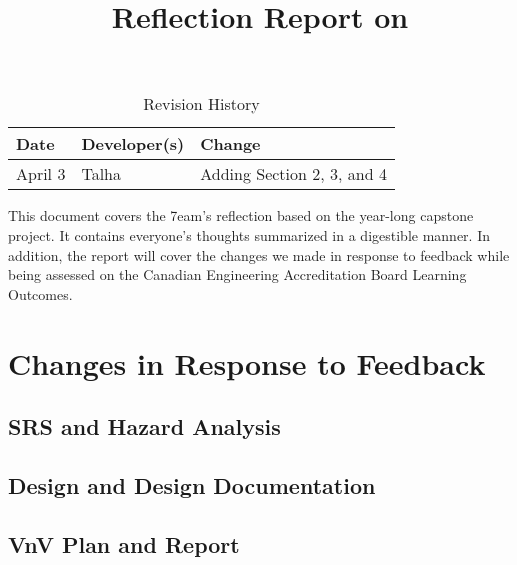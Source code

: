 \documentclass{article}
\title{Reflection Report on \progname}
\author{\authname}
\date{}
\begin{document}
\maketitle

\newpage

\tableofcontents

\newpage

\begin{table}[hp]
\caption{Revision History} \label{TblRevisionHistory}
\begin{tabularx}{\textwidth}{llX}
\toprule
\textbf{Date} & \textbf{Developer(s)} & \textbf{Change}\\
\midrule
April 3 & Talha & Adding Section 2, 3, and 4\\
\bottomrule
\end{tabularx}
\end{table}

\newpage

\noindent This document covers the 7eam's reflection based on the year-long capstone project. It contains everyone's thoughts summarized in a digestible manner. In addition, the report will cover the changes we made in response to feedback while being assessed on the Canadian Engineering Accreditation Board Learning Outcomes.

\section{Changes in Response to Feedback}



\subsection{SRS and Hazard Analysis}

\subsection{Design and Design Documentation}

\subsection{VnV Plan and Report}
\end{document}
